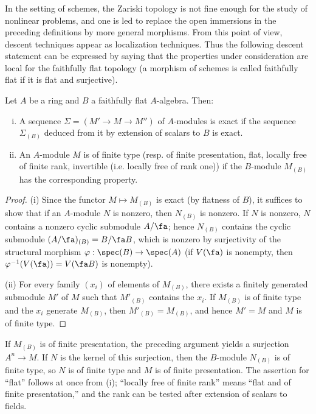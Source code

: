 \documentclass[oneside]{book}
\begin{document}
\subsubsection{}\label{I:1-4-1}

In the setting of schemes, the Zariski topology is not fine enough for the
study of nonlinear problems, and one is led to replace the open immersions
in the preceding definitions by more general morphisms. From this point of
view, descent techniques appear as localization techniques. Thus the
following descent statement can be expressed by saying that the properties
under consideration are local for the faithfully flat topology (a morphism
of schemes is called faithfully flat if it is flat and surjective).

\begin{proposition}\label{I:1-4-2}
Let $A$ be a ring and $B$ a faithfully flat $A$-algebra. Then:
\begin{enumerate}[(i)]
  \item A sequence $\Sigma=(M'\to M\to M'')$ of $A$-modules is exact if
    the sequence $\Sigma_{(B)}$ deduced from it by extension of scalars to
    $B$ is exact.
  \item An $A$-module $M$ is of finite type (resp. of finite presentation,
    flat, locally free of finite rank, invertible (i.e. locally free of rank
    one)) if the $B$-module $M_{(B)}$ has the corresponding property.
\end{enumerate}
\end{proposition}
\begin{proof}
(i) Since the functor $M\mapsto M_{(B)}$ is exact (by flatness of $B$),
it suffices to show that if an $A$-module $N$ is nonzero, then
$N_{(B)}$ is nonzero. If $N$ is nonzero, $N$ contains a nonzero cyclic
submodule $A/\fa$; hence $N_{(B)}$ contains the cyclic submodule
$(A/\fa)_{(B)}=B/\fa B$, which is nonzero by surjectivity of the
structural morphism $\varphi:\spec(B)\to\spec(A)$ (if $V(\fa)$ is
nonempty, then $\varphi^{-1}(V(\fa))=V(\fa B)$ is nonempty).

(ii) For every family $(x_i)$ of elements of $M_{(B)}$, there exists a
finitely generated submodule $M'$ of $M$ such that $M'_{(B)}$ contains
the $x_i$. If $M_{(B)}$ is of finite type and the $x_i$ generate
$M_{(B)}$, then $M'_{(B)}=M_{(B)}$, and hence $M'=M$ and $M$ is of
finite type.
\end{proof}

If $M_{(B)}$ is of finite presentation, the preceding argument yields a
surjection $A^n\to M$. If $N$ is the kernel of this surjection, then the
$B$-module $N_{(B)}$ is of finite type, so $N$ is of finite type and
$M$ is of finite presentation. The assertion for “flat” follows at once
from (i); “locally free of finite rank” means “flat and of finite
presentation,” and the rank can be tested after extension of scalars to
fields.
\end{document}
